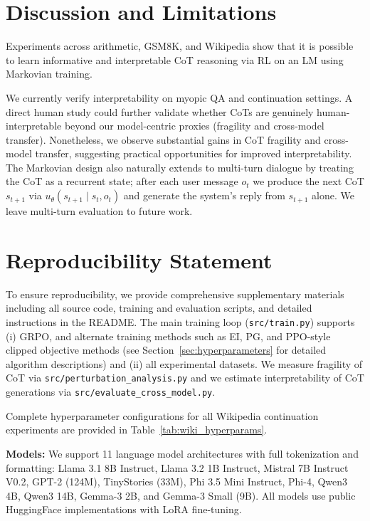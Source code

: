 \documentclass{article} %
\begin{document}
\section{Discussion and Limitations}
\label{sec:disc}

Experiments across arithmetic, GSM8K, and Wikipedia show that it is possible to learn informative and interpretable CoT reasoning via RL on an LM using Markovian training.

We currently verify interpretability on myopic QA and continuation settings. A direct human study could further validate whether CoTs are genuinely human-interpretable beyond our model-centric proxies (fragility and cross-model transfer). Nonetheless, we observe substantial gains in CoT fragility and cross-model transfer, suggesting practical opportunities for improved interpretability. The Markovian design also naturally extends to multi-turn dialogue by treating the CoT as a recurrent state; after each user message $o_t$ we produce the next CoT $s_{t+1}$ via $u_\theta(s_{t+1}\mid s_t, o_t)$ and generate the system's reply from $s_{t+1}$ alone. We leave multi-turn evaluation to future work.



\clearpage
\section{Reproducibility Statement}
To ensure reproducibility, we provide comprehensive supplementary materials including all source code, training and evaluation scripts, and detailed instructions in the README. The main training loop (\texttt{src/train.py}) supports (i) GRPO, and alternate training methods such as EI, PG, and PPO-style clipped objective methods (see Section~\ref{sec:hyperparameters} for detailed algorithm descriptions) and (ii) all experimental datasets. We measure fragility of CoT via \texttt{src/perturbation\_analysis.py} and we estimate interpretability of CoT generations via \texttt{src/evaluate\_cross\_model.py}. 

Complete hyperparameter configurations for all Wikipedia continuation experiments are provided in Table~\ref{tab:wiki_hyperparams}.

\textbf{Models:} We support 11 language model architectures with full tokenization and formatting: Llama 3.1 8B Instruct, Llama 3.2 1B Instruct, Mistral 7B Instruct V0.2, GPT-2 (124M), TinyStories (33M), Phi 3.5 Mini Instruct, Phi-4, Qwen3 4B, Qwen3 14B, Gemma-3 2B, and Gemma-3 Small (9B). All models use public HuggingFace implementations with LoRA fine-tuning.
\end{document}
